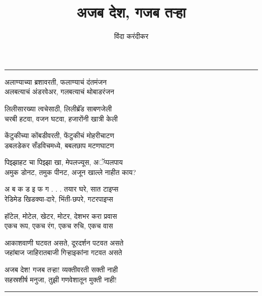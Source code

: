 \documentclass[17pt]{extarticle}  %
\begin{document}
\title{अजब देश, गजब तऱ्हा}
\author{विंदा करंदीकर}
\date{}
\maketitle
\hrule
\vspace{5mm}



अलाण्याच्या ब्रशावरती, फलाण्याचं दंतमंजन\\
अलबत्याचं अंडरवेअर, गलबत्याचं थोबाडरंजन 

लिलीसारख्या त्वचेसाठी, लिलीब्रॅंड साबणजेली\\
चरबी हटवा, वजन घटवा, हजारोंनी खात्री केली

केंटुकीच्या कोंबडीवरती, फेंटुकीचं मोहरीचाटण\\
डबलडेकर सँडविचमध्ये, बबलछाप मटणघाटण

पिझ्झाहट चा पिझ्झा खा, मेपलज्यूस, अॅप्पलपाय\\
अमुक डोनट, तमुक पीनट, अजून खाल्ले नाहीत काय?

अ ब क ड इ फ ग  . . .  तयार घरे, सात टाइप्स\\
रेडिमेड खिडक्या-दारे, भिंती-छपरे, गटरपाइप्स 

हॉटेल, मोटेल, खेटर, मोटर, देशभर करा प्रवास\\
एकच रूप, एकच रंग, एकच रुचि, एकच वास 

आकाशवाणी घटवत असते, दूरदर्शन पटवत असते\\
जहांबाज जाहिरातबाजी गिऱ्हाइकांना गटवत असते 

अजब देश! गजब तऱ्हा! व्यक्तीवरती सक्ती नाही\\
सहस्रशीर्ष मनुजा, तुझी गणवेशातून मुक्ती नाही!

\vspace{5mm}
\hrule
\end{document}
